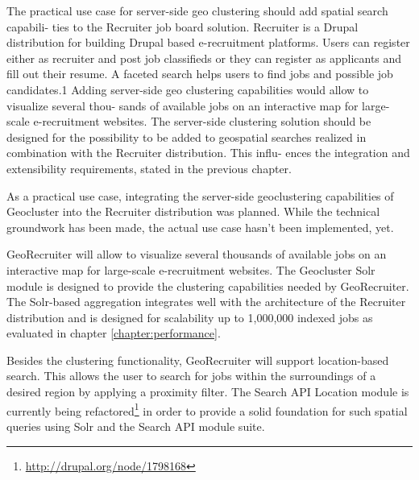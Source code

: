 The practical use case for server-side geo clustering should add spatial search capabili- ties to the Recruiter job board solution.
Recruiter is a Drupal distribution for building Drupal based e-recruitment platforms. Users can register either as recruiter and post job classifieds or they can register as applicants and fill out their resume. A faceted search helps users to find jobs and possible job candidates.1
Adding server-side geo clustering capabilities would allow to visualize several thou- sands of available jobs on an interactive map for large-scale e-recruitment websites. The server-side clustering solution should be designed for the possibility to be added to geospatial searches realized in combination with the Recruiter distribution. This influ- ences the integration and extensibility requirements, stated in the previous chapter.

As a practical use case, integrating the server-side geoclustering capabilities of Geocluster into the Recruiter distribution was planned. While the technical groundwork has been made, the actual use case hasn't been implemented, yet.

GeoRecruiter will allow to visualize several thousands of available jobs on an interactive map for large-scale e-recruitment websites. The Geocluster Solr module is designed to provide the clustering capabilities needed by GeoRecruiter. The Solr-based aggregation integrates well with the architecture of the Recruiter distribution and is designed for scalability up to 1,000,000 indexed jobs as evaluated in chapter \ref{chapter:performance}.

Besides the clustering functionality, GeoRecruiter will support location-based search. This allows the user to search for jobs within the surroundings of a desired region by applying a proximity filter. The Search API Location module is currently being refactored\footnote{\url{http://drupal.org/node/1798168}} in order to provide a solid foundation for such spatial queries using Solr and the Search API module suite.